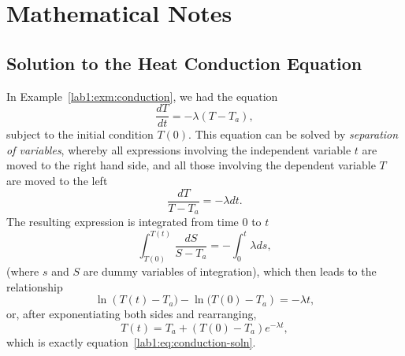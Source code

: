 % 
%
%
%
%
%
%
%

\section{Mathematical Notes}
\label{lab1:ap:mathnote}

\subsection{Solution to the Heat Conduction Equation}
\label{lab1:ap:conduction}

In Example~\ref{lab1:exm:conduction}, we had the equation
\[
  \frac{dT}{dt} = -\lambda (T-T_a),
\]
subject to the initial condition $T(0)$.  This equation can be solved
by \emph{separation of variables}, whereby all expressions involving
the independent variable $t$ are moved to the right hand side, and all
those involving the dependent variable $T$ are moved to the left
\[
  \frac{dT}{T-T_a} = -\lambda dt.
\]
The resulting expression is integrated from time $0$ to $t$
\[
  \int_{T(0)}^{T(t)} \frac{dS}{S-T_a} = -\int_0^t\lambda ds,
\]
(where $s$ and $S$ are dummy variables of integration), which then
leads to the relationship
\[
  \ln \left( T(t)-T_a)-\ln(T(0)-T_a \right) = -\lambda t,
\]
or, after exponentiating both sides and rearranging,
\[
  T(t) = T_a + (T(0)-T_a)e^{-\lambda t},
\]
which is exactly equation~\eqref{lab1:eq:conduction-soln}.

